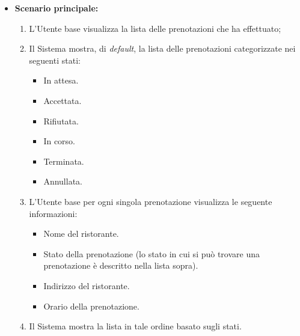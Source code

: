 \begin{itemize}
	\item \textbf{Scenario principale:}
	      \begin{enumerate}
		      \item L'Utente base visualizza la lista delle prenotazioni che ha effettuato;
		      \item Il Sistema mostra, di \textit{default}, la lista delle prenotazioni categorizzate nei seguenti stati:
		            \begin{itemize}
			            \item In attesa.
			            \item Accettata.
			            \item Rifiutata.
			            \item In corso.
			            \item Terminata.
			            \item Annullata.
		            \end{itemize}
				\item L'Utente base per ogni singola prenotazione visualizza le seguente informazioni:
					\begin{itemize}
						\item Nome del ristorante.
						\item Stato della prenotazione (lo stato in cui si può trovare una prenotazione è descritto nella lista sopra).
						\item Indirizzo del ristorante.
						\item Orario della prenotazione.
					\end{itemize}
		      \item Il Sistema mostra la lista in tale ordine basato sugli stati.
	      \end{enumerate}
\end{itemize}